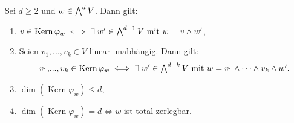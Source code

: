 \documentclass[a4paper,12pt,index=toc]{scrbook}
\theoremstyle{keinenummern} %
\newcommand{\Kern}{\operatorname{Kern}}
\renewcommand{\dotsc}{\ensuremath{\!...}}
\let\grassmann\bigwedge
\def\bigwedge{\begingroup\textstyle\grassmann\endgroup}
\begin{document}
\begin{lem}\label{2.7.3}
Sei $d\geq 2$ und $w\in\bigwedge^{d}V$. Dann gilt:
\begin{enumerate}
\item{} $v\in\Kern\varphi_{w}\iff\exists\; w'\in\bigwedge^{d-1}V\text{ mit }w=v\wedge w'$,
\item{} Seien $v_{1},\dotsc,v_{k}\in V$ linear unabhängig. Dann gilt:
\begin{equation*}v_{1},\dotsc,v_{k}\in\Kern\varphi_{w}\iff\exists\; w'\in\bigwedge^{d-k}V\text{ mit }w=v_{1}\wedge\dotsm\wedge v_{k}\wedge w'.\end{equation*}
\item{} $\dim(\Kern\varphi_{w})\leq d$,
\item{} $\dim(\Kern\varphi_{w})=d\iff w$ ist total zerlegbar.
\end{enumerate}\end{lem}
\end{document}
